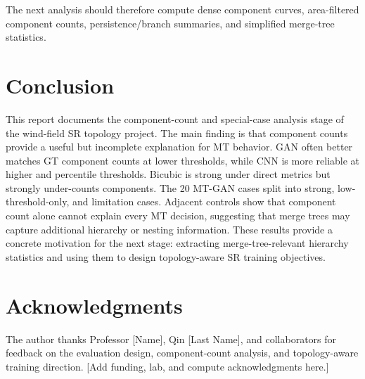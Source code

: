 \documentclass[conference]{IEEEtran}
\begin{document}
The next analysis should therefore compute dense component curves, area-filtered component counts, persistence/branch summaries, and simplified merge-tree statistics.

\section{Conclusion}

This report documents the component-count and special-case analysis stage of the wind-field SR topology project. The main finding is that component counts provide a useful but incomplete explanation for MT behavior. GAN often better matches GT component counts at lower thresholds, while CNN is more reliable at higher and percentile thresholds. Bicubic is strong under direct metrics but strongly under-counts components. The 20 MT-GAN cases split into strong, low-threshold-only, and limitation cases. Adjacent controls show that component count alone cannot explain every MT decision, suggesting that merge trees may capture additional hierarchy or nesting information. These results provide a concrete motivation for the next stage: extracting merge-tree-relevant hierarchy statistics and using them to design topology-aware SR training objectives.

\section*{Acknowledgments}

The author thanks Professor [Name], Qin [Last Name], and collaborators for feedback on the evaluation design, component-count analysis, and topology-aware training direction. [Add funding, lab, and compute acknowledgments here.]



\end{document}
